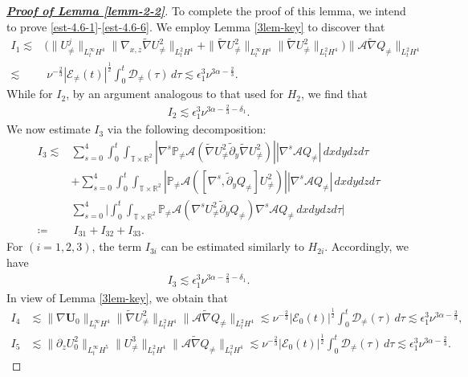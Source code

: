 \documentclass[11pt,reqno]{article}
\numberwithin{equation}{section}
\newcommand\R{{\mathbb R}}
\newcommand\T{{\mathbb T}}
\newcommand\PP{{\mathbb P}}
\newcommand\D{{\mathcal D}}
\newcommand\E{{\mathcal E}}
\newcommand\A{\mathcal{A}}
\newcommand\U{\bm{U}}
\newcommand \tri {\coloneqq}
\let\pa=\partial
\let\al=\alpha
\let\f=\frac
\let\ep=\epsilon
\begin{document}
\begin{proof}[\underline{\textbf{Proof of Lemma \ref{lemm-2-2}}}]
To complete the proof of this lemma, we intend to prove \eqref{est-4.6-1}-\eqref{est-4.6-6}.
We employ Lemma \ref{3lem-key} to discover that
\begin{align*}
	I_1
	\lesssim&
	\big(\|U_{\not=}^j\|_{L^\infty_tH^4}\|\nabla_{x,z}\widetilde{\nabla}U_{\not=}^2\|_{L^2_tH^4}
	+
	\|\widetilde{\nabla}U_{\not=}^2\|_{L^\infty_tH^4}\|\widetilde{\nabla}U_{\not=}^2\|_{L^2_tH^4}
	\big)
	\|\A\widetilde{\nabla}Q_{\not=}\|_{L^2_tH^4}
	\\
	\lesssim& ~\nu^{-\f23} |\E_{\not=}(t)|^{\f12}\int_0^t\D_{\not=}(\tau)\,d\tau
	\lesssim  \ep_1^3\nu^{3\al-\f23}.
\end{align*}
While for $I_2$, by an argument analogous to that used for $H_2$, we find that
\begin{align*}
	I_{2} \lesssim \ep_1^3\nu^{3\al-\f23-\delta_1}.
\end{align*}
We now estimate $I_3$ via the following decomposition:
\begin{align*}
	I_3
	\lesssim &
	\sum_{s=0}^{4}
	\int_0^t\int_{\T\times\R^2}
	|\nabla^s\PP_{\not=}\A( \widetilde{\nabla}U_{\not=}^2  \widetilde{\partial}_y\widetilde{\nabla}U_{\not=}^2)|
	|\nabla^s\A Q_{\not=}|\,dxdydzd\tau
	\\
	&+\sum_{s=0}^{4}
	\int_0^t\int_{\T\times\R^2}
	|\PP_{\not=}\A( [\nabla^s,\widetilde{\pa}_yQ_{\not=}] U_{\not=}^2)|
	|\nabla^s\A Q_{\not=}|\,dxdydzd\tau
	\\
	&\sum_{s=0}^{4}
	\Big|\int_0^t\int_{\T\times\R^2}
	\PP_{\not=}\A( \nabla^sU_{\not=}^2\widetilde{\pa}_yQ_{\not=})\nabla^s\A Q_{\not=}\,dxdydzd\tau \Big|
	\\
	\tri &~I_{31}+I_{32}+I_{33}.
\end{align*}
For $(i=1,2,3)$, the term $I_{3i}$ can be estimated similarly to $H_{2i}$.
Accordingly, we have
\begin{align*}
	I_{3} \lesssim \ep_1^3\nu^{3\al-\f23-\delta_1}.
\end{align*}
In view of Lemma \ref{3lem-key}, we obtain that
\begin{align*}
	I_4
	&\lesssim
	\|\nabla \U_{0}\|_{L^\infty_tH^4}
	\|\widetilde{\nabla}U_{\not=}^2\|_{L^2_tH^4}
	\|\A\widetilde{\nabla}Q_{\not=}\|_{L^2_tH^4}
	\lesssim \nu^{-\f23} |\E_{0}(t)|^{\f12} \int_0^t\D_{\not=}(\tau)\,d\tau
	\lesssim  \ep_1^3\nu^{3\al-\f23},
	\\
	I_5
	&\lesssim
	\|\pa_{z}U_{0}^2\|_{L^\infty_tH^5}\|U_{\not=}^3\|_{L^2_tH^4}
	\|\A\widetilde{\nabla}Q_{\not=}\|_{L^2_tH^4}
	\lesssim \nu^{-\f23} |\E_{0}(t)|^{\f12} \int_0^t\D_{\not=}(\tau)\,d\tau
	\lesssim  \ep_1^3\nu^{3\al-\f23}.

\end{align*}
\end{proof}
\end{document}
